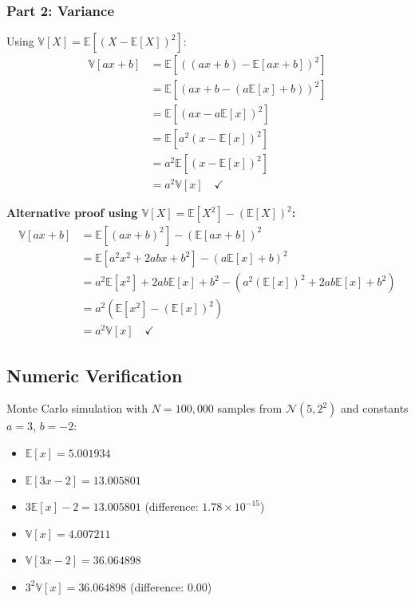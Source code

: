 \documentclass[12pt]{article}
\begin{document}
\subsubsection*{Part 2: Variance}
Using $\mathbb{V}[X] = \mathbb{E}[(X - \mathbb{E}[X])^2]$:
\begin{align}
\mathbb{V}[ax + b] &= \mathbb{E}\left[ \left( (ax + b) - \mathbb{E}[ax + b] \right)^2 \right] \\
&= \mathbb{E}\left[ \left( ax + b - (a\mathbb{E}[x] + b) \right)^2 \right] \\
&= \mathbb{E}\left[ \left( ax - a\mathbb{E}[x] \right)^2 \right] \\
&= \mathbb{E}\left[ a^2 (x - \mathbb{E}[x])^2 \right] \\
&= a^2 \mathbb{E}\left[ (x - \mathbb{E}[x])^2 \right] \\
&= a^2 \mathbb{V}[x] \quad \checkmark
\end{align}

\textbf{Alternative proof using $\mathbb{V}[X] = \mathbb{E}[X^2] - (\mathbb{E}[X])^2$:}
\begin{align}
\mathbb{V}[ax + b] &= \mathbb{E}[(ax + b)^2] - (\mathbb{E}[ax + b])^2 \\
&= \mathbb{E}[a^2x^2 + 2abx + b^2] - (a\mathbb{E}[x] + b)^2 \\
&= a^2\mathbb{E}[x^2] + 2ab\mathbb{E}[x] + b^2 - (a^2(\mathbb{E}[x])^2 + 2ab\mathbb{E}[x] + b^2) \\
&= a^2(\mathbb{E}[x^2] - (\mathbb{E}[x])^2) \\
&= a^2 \mathbb{V}[x] \quad \checkmark
\end{align}

\subsection*{Numeric Verification}
Monte Carlo simulation with $N = 100,000$ samples from $\mathcal{N}(5, 2^2)$ and constants $a = 3$, $b = -2$:

\begin{itemize}
    \item $\mathbb{E}[x] = 5.001934$
    \item $\mathbb{E}[3x - 2] = 13.005801$
    \item $3\mathbb{E}[x] - 2 = 13.005801$ (difference: $1.78 \times 10^{-15}$)
    \item $\mathbb{V}[x] = 4.007211$
    \item $\mathbb{V}[3x - 2] = 36.064898$
    \item $3^2 \mathbb{V}[x] = 36.064898$ (difference: $0.00$)
\end{itemize}
\end{document}
